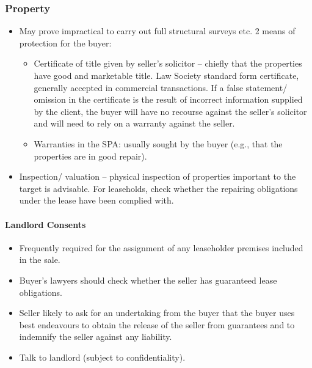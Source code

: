 \documentclass[
]{article}
\providecommand{\tightlist}{%
  \setlength{\itemsep}{0pt}\setlength{\parskip}{0pt}}
\begin{document}
\hypertarget{property}{%
\subsubsection{Property}\label{property}}

\begin{itemize}
\tightlist
\item
  May prove impractical to carry out full structural surveys etc. 2
  means of protection for the buyer:

  \begin{itemize}
  \tightlist
  \item
    Certificate of title given by seller's solicitor -- chiefly that the
    properties have good and marketable title. Law Society standard form
    certificate, generally accepted in commercial transactions. If a
    false statement/ omission in the certificate is the result of
    incorrect information supplied by the client, the buyer will have no
    recourse against the seller's solicitor and will need to rely on a
    warranty against the seller.
  \item
    Warranties in the SPA: usually sought by the buyer (e.g., that the
    properties are in good repair).
  \end{itemize}
\item
  Inspection/ valuation -- physical inspection of properties important
  to the target is advisable. For leaseholds, check whether the
  repairing obligations under the lease have been complied with.
\end{itemize}

\hypertarget{landlord-consents}{%
\paragraph{Landlord Consents}\label{landlord-consents}}

\begin{itemize}
\tightlist
\item
  Frequently required for the assignment of any leaseholder premises
  included in the sale.
\item
  Buyer's lawyers should check whether the seller has guaranteed lease
  obligations.
\item
  Seller likely to ask for an undertaking from the buyer that the buyer
  uses best endeavours to obtain the release of the seller from
  guarantees and to indemnify the seller against any liability.
\item
  Talk to landlord (subject to confidentiality).
\end{itemize}
\end{document}
